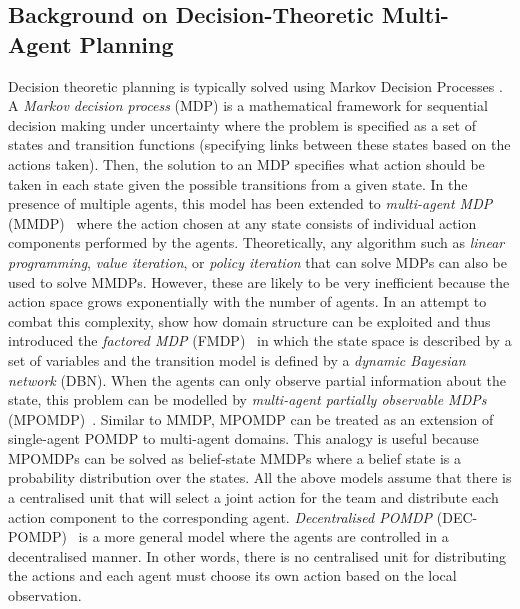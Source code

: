 \subsection{Background on Decision-Theoretic Multi-Agent Planning}\label{sec:decisiontheoretic}
Decision theoretic planning is typically solved using Markov Decision Processes \cite{kolobov2012planning}. A {\em Markov decision process} (MDP) is a mathematical framework for sequential decision making under uncertainty where the problem is specified as a set of states and transition functions (specifying links between these states based on the actions taken). Then, the solution to an MDP specifies what action should be taken in each state given the possible transitions from a given state. In the presence of multiple agents, this model has been extended to {\em multi-agent MDP} (MMDP)~\cite{boutilier1996planning} where the action chosen at any state consists of individual action components performed by the agents. Theoretically, any algorithm such as {\em linear programming}, {\em value iteration}, or {\em policy iteration} that can solve MDPs can also be used to solve MMDPs. However, these are likely to be very inefficient because the action space grows exponentially with the number of agents. In an attempt to combat this complexity,  \cite{boutilier2000stochastic} show how  domain structure can be exploited and  thus introduced the {\em factored MDP} (FMDP)~  in which the state space is described by a set of variables and the transition model is defined by a {\em dynamic Bayesian network} (DBN). When the agents can only observe partial
information about the state, this problem can be modelled by {\em multi-agent partially observable MDPs} (MPOMDP)~\cite{pynadath2002communicative}. Similar to MMDP, MPOMDP can be treated as an extension of single-agent POMDP to multi-agent domains. This analogy is useful because MPOMDPs can be solved as belief-state MMDPs where a belief state is a probability distribution over the states. All the above models assume that there is a centralised unit that will select a joint action for the team and distribute each action component to the corresponding agent. {\em Decentralised POMDP} (DEC-POMDP)~\cite{bernstein2002complexity} is a more general model where the agents are controlled in a decentralised manner. In other words, there is no centralised unit for distributing the actions and each agent must choose its own action based on the local observation.

